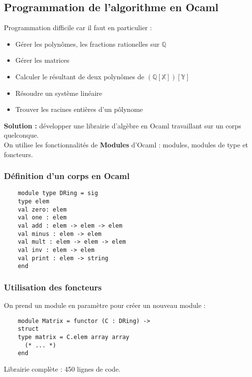 \documentclass[17 pt,french]{scrartcl}
\begin{document}
\subsection*{Programmation de l'algorithme en \textbf{Ocaml}}
	
	Programmation difficile car il faut en particulier : 
	\begin{itemize}
	\item Gérer les polynômes, les fractions rationelles sur $\mathbb{Q}$
	\item Gérer les matrices
	\item Calculer le résultant de deux polynômes de $\mathbb{(Q[X])[Y]}$
	\item Résoudre un système linéaire
	\item Trouver les racines entières d'un pôlynome
	\end{itemize}
	
	\textbf{Solution : } développer une librairie d'algèbre en Ocaml travaillant sur un corps quelconque. \\
	On utilise les fonctionnalités de \textbf{Modules} d'Ocaml : modules, modules de type et foncteurs.
	\subsubsection*{Définition d'un corps en Ocaml}
	\begin{lstlisting}
	module type DRing = sig
   	type elem
  	val zero: elem
  	val one : elem
   	val add : elem -> elem -> elem
   	val minus : elem -> elem
    val mult : elem -> elem -> elem
    val inv : elem -> elem
    val print : elem -> string
	end
	\end{lstlisting}
	\newpage
	\subsubsection*{Utilisation des foncteurs}
	On prend un module en paramètre pour créer un nouveau module : 
	\begin{lstlisting}
	module Matrix = functor (C : DRing) ->
  	struct
  	type matrix = C.elem array array
  	  (* ... *)
  	end
  	\end{lstlisting}
  	Librairie complète : 450 lignes de code.
\end{document}
